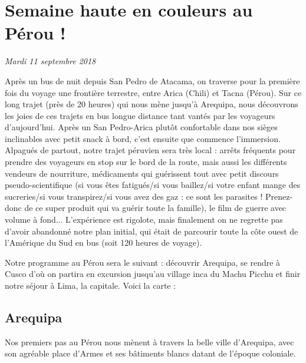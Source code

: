 \hypertarget{semaine-haute-en-couleurs-au-puxe9rou}{%
\section{Semaine haute en couleurs au Pérou
!}\label{semaine-haute-en-couleurs-au-puxe9rou}}

\emph{Mardi 11 septembre 2018}

Après un bus de nuit depuis San Pedro de Atacama, on traverse pour la
première fois du voyage une frontière terrestre, entre Arica (Chili) et
Tacna (Pérou). Sur ce long trajet (près de 20 heures) qui nous mène
jusqu'à Arequipa, nous découvrons les joies de ces trajets en bus longue
distance tant vantés par les voyageurs d'aujourd'hui. Après un San
Pedro-Arica plutôt confortable dans nos sièges inclinables avec petit
snack à bord, c'est ensuite que commence l'immersion. Alpagués de
partout, notre trajet péruvien sera très local : arrêts fréquents pour
prendre des voyageurs en stop sur le bord de la route, mais aussi les
différents vendeurs de nourriture, médicaments qui guérissent tout avec
petit discours pseudo-scientifique (si vous êtes fatigués/si vous
baillez/si votre enfant mange des sucreries/si vous transpirez/si vous
avez des gaz : ce sont les parasites ! Prenez-donc de ce super produit
qui va guérir toute la famille), le film de guerre avec volume à fond...
L'expérience est rigolote, mais finalement on ne regrette pas d'avoir
abandonné notre plan initial, qui était de parcourir toute la côte ouest
de l'Amérique du Sud en bus (soit 120 heures de voyage).

Notre programme au Pérou sera le suivant : découvrir Arequipa, se rendre
à Cusco d'où on partira en excursion jusqu'au village inca du Machu
Picchu et finir notre séjour à Lima, la capitale. Voici la carte :

\hypertarget{mapid}{}

\hypertarget{arequipa}{%
\subsection{Arequipa}\label{arequipa}}

Nos premiers pas au Pérou nous mènent à travers la belle ville
d'Arequipa, avec son agréable place d'Armes et ses bâtiments blancs
datant de l'époque coloniale.

